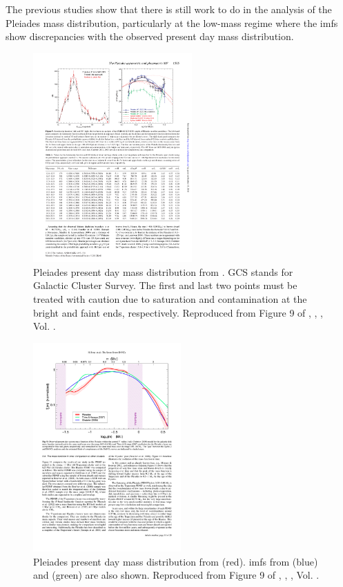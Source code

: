 The previous studies show that there is still work to do in the analysis of the Pleiades mass distribution, particularly at the low-mass regime where the \glspl{imf} show discrepancies with the observed present day mass distribution.  

\begin{figure}[ht!]
\begin{center}
\includegraphics[height=8cm]{background/Figures/F9b_Lodieu2012.pdf}
\caption{Pleiades present day mass distribution from \citet{Lodieu2012}. GCS stands for Galactic Cluster Survey. The first and last two points must be treated with caution due to saturation and contamination at the bright and faint ends, respectively. Reproduced from Figure 9 of \citet{Lodieu2012}, \textit{}, , Vol. .}
\label{fig:massLodieu}
\end{center}
\end{figure}

\begin{figure}[ht!]
\begin{center}
\includegraphics[height=8cm]{background/Figures/F9_Bouy2015.pdf}
\caption{Pleiades present day mass distribution  from \citet{Bouy2015} (red). \glspl{imf} from \citet{Chabrier2005}(blue) and \citet{Thies2007} (green) are also shown. Reproduced from Figure 9 of \citet{Bouy2015}, \textit{}, , Vol. .}
\label{fig:massBouy}
\end{center}
\end{figure}

